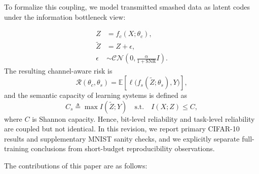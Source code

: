 \documentclass[10pt,journal]{IEEEtran}
\begin{document}
To formalize this coupling, we model transmitted smashed data as latent codes under the information bottleneck view\cite{tishby2000informationbottleneckmethod,9082644}:

\begin{equation}
\begin{aligned}
Z&=f_c(X;\theta_c), \\
\tilde{Z}&=Z+\epsilon, \\
\epsilon&\sim\mathcal{CN}\!\left(0,\frac{\alpha}{1+\mathrm{SNR}}I\right).
\end{aligned}
\end{equation}
The resulting channel-aware risk is
\begin{equation}
\mathcal{R}(\theta_c,\theta_s)=\mathbb{E}\!\left[\ell\big(f_s(\tilde{Z};\theta_s),Y\big)\right],
\end{equation}
and the semantic capacity of learning systems is defined as
\begin{equation}
C_s \triangleq \max I(\tilde{Z};Y)
\quad
\text{s.t.}
\quad
I(X;Z)\le C,
\end{equation}
where $C$ is Shannon capacity\cite{6773024}. Hence, bit-level reliability and task-level reliability are coupled but not identical. In this revision, we report primary CIFAR-10 results and supplementary MNIST sanity checks, and we explicitly separate full-training conclusions from short-budget reproducibility observations.

The contributions of this paper are as follows:
\end{document}
